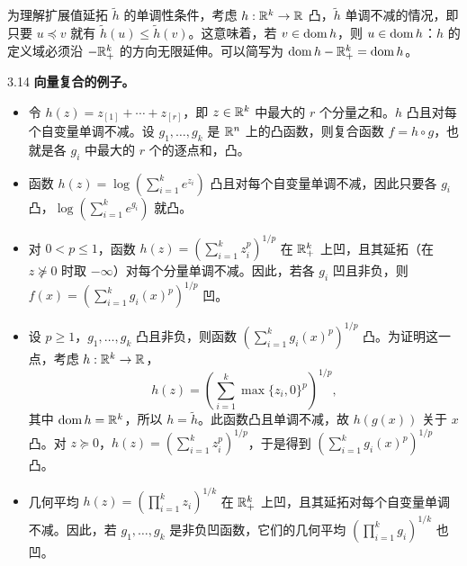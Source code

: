 为理解扩展值延拓 $\widetilde h$ 的单调性条件，考虑 $h:\mathbb R^k\to\mathbb R$ 凸，$\widetilde h$ 单调不减的情况，即只要 $u\preceq v$ 就有 $\widetilde h(u)\leq\widetilde h(v)$。这意味着，若 $v\in\operatorname{dom} h$，则 $u\in\operatorname{dom} h$：$h$ 的定义域必须沿 $-\mathbb R_+^k$ 的方向无限延伸。可以简写为 $\operatorname{dom} h-\mathbb R_+^k=\operatorname{dom} h$。
\begin{origexample}{3.14}
\textbf{向量复合的例子。}
\begin{itemize}
\item 令 $h(z)=z_{[1]}+\cdots+z_{[r]}$，即 $z\in\mathbb R^k$ 中最大的 $r$ 个分量之和。$h$ 凸且对每个自变量单调不减。设 $g_1,\ldots,g_k$ 是 $\mathbb R^n$ 上的凸函数，则复合函数 $f=h\circ g$，也就是各 $g_i$ 中最大的 $r$ 个的逐点和，凸。
\item 函数 $h(z)=\log(\sum_{i=1}^k e^{z_i})$ 凸且对每个自变量单调不减，因此只要各 $g_i$ 凸，$\log(\sum_{i=1}^k e^{g_i})$ 就凸。
\item 对 $0<p\leq1$，函数 $h(z)=(\sum_{i=1}^k z_i^p)^{1/p}$ 在 $\mathbb R_+^k$ 上凹，且其延拓（在 $z\not\succeq0$ 时取 $-\infty$）对每个分量单调不减。因此，若各 $g_i$ 凹且非负，则 $f(x)=(\sum_{i=1}^k g_i(x)^p)^{1/p}$ 凹。
\item 设 $p\geq1$，$g_1,\ldots,g_k$ 凸且非负，则函数 $(\sum_{i=1}^k g_i(x)^p)^{1/p}$ 凸。为证明这一点，考虑 $h:\mathbb R^k\to\mathbb R$，
\[h(z)=\left(\sum_{i=1}^k\max\{z_i,0\}^p\right)^{1/p},\]
其中 $\operatorname{dom} h=\mathbb R^k$，所以 $h=\widetilde h$。此函数凸且单调不减，故 $h(g(x))$ 关于 $x$ 凸。对 $z\succeq0$，$h(z)=(\sum_{i=1}^k z_i^p)^{1/p}$，于是得到 $(\sum_{i=1}^k g_i(x)^p)^{1/p}$ 凸。
\item 几何平均 $h(z)=(\prod_{i=1}^k z_i)^{1/k}$ 在 $\mathbb R_+^k$ 上凹，且其延拓对每个自变量单调不减。因此，若 $g_1,\ldots,g_k$ 是非负凹函数，它们的几何平均 $(\prod_{i=1}^k g_i)^{1/k}$ 也凹。
\end{itemize}
\end{origexample}
